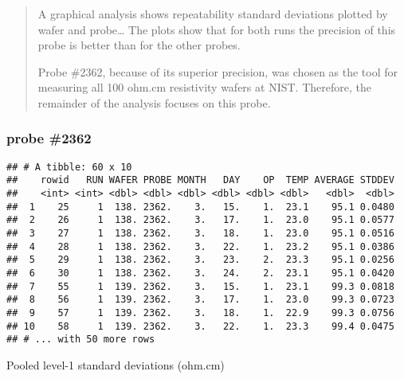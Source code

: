 \documentclass[]{book}
\newenvironment{Shaded}{\begin{snugshade}}{\end{snugshade}}
\newcommand{\DecValTok}[1]{\textcolor[rgb]{0.00,0.00,0.81}{#1}}
\newcommand{\KeywordTok}[1]{\textcolor[rgb]{0.13,0.29,0.53}{\textbf{#1}}}
\newcommand{\NormalTok}[1]{#1}
\newcommand{\OperatorTok}[1]{\textcolor[rgb]{0.81,0.36,0.00}{\textbf{#1}}}
\newcommand{\StringTok}[1]{\textcolor[rgb]{0.31,0.60,0.02}{#1}}
\theoremstyle{definition}
\theoremstyle{definition}
\theoremstyle{definition}
\theoremstyle{remark}
\begin{document}
\begin{quote}
A graphical analysis shows repeatability standard deviations plotted by
wafer and probe\ldots{} The plots show that for both runs the precision
of this probe is better than for the other probes.

Probe \#2362, because of its superior precision, was chosen as the tool
for measuring all 100 ohm.cm resistivity wafers at NIST. Therefore, the
remainder of the analysis focuses on this probe.
\end{quote}

\hypertarget{probe-2362}{%
\subsubsection{probe \#2362}\label{probe-2362}}

\begin{Shaded}
\end{Shaded}

\begin{verbatim}
## # A tibble: 60 x 10
##    rowid   RUN WAFER PROBE MONTH   DAY    OP  TEMP AVERAGE STDDEV
##    <int> <int> <dbl> <dbl> <dbl> <dbl> <dbl> <dbl>   <dbl>  <dbl>
##  1    25     1  138. 2362.    3.   15.    1.  23.1    95.1 0.0480
##  2    26     1  138. 2362.    3.   17.    1.  23.0    95.1 0.0577
##  3    27     1  138. 2362.    3.   18.    1.  23.0    95.1 0.0516
##  4    28     1  138. 2362.    3.   22.    1.  23.2    95.1 0.0386
##  5    29     1  138. 2362.    3.   23.    2.  23.3    95.1 0.0256
##  6    30     1  138. 2362.    3.   24.    2.  23.1    95.1 0.0420
##  7    55     1  139. 2362.    3.   15.    1.  23.1    99.3 0.0818
##  8    56     1  139. 2362.    3.   17.    1.  23.0    99.3 0.0723
##  9    57     1  139. 2362.    3.   18.    1.  22.9    99.3 0.0756
## 10    58     1  139. 2362.    3.   22.    1.  23.3    99.4 0.0475
## # ... with 50 more rows
\end{verbatim}

Pooled level-1 standard deviations (ohm.cm)
\end{document}
